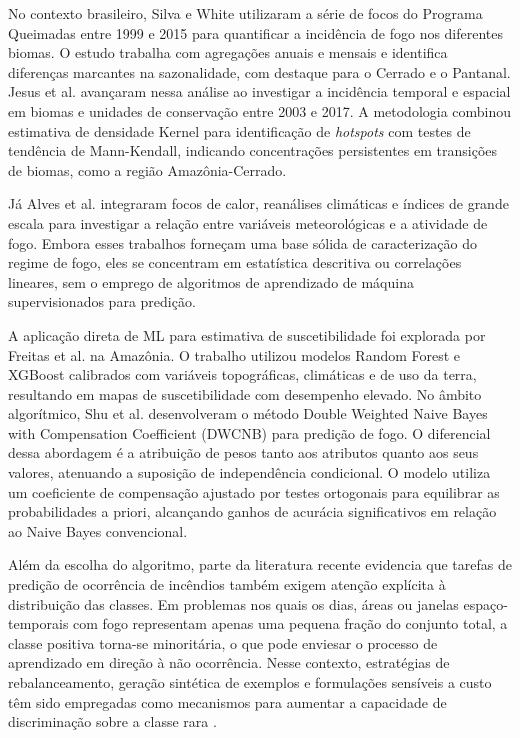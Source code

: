 No contexto brasileiro, Silva e White \cite{silva2016deteccao} utilizaram a série de focos do Programa Queimadas entre 1999 e 2015 para quantificar a incidência de fogo nos diferentes biomas. O estudo trabalha com agregações anuais e mensais e identifica diferenças marcantes na sazonalidade, com destaque para o Cerrado e o Pantanal. Jesus et al. \cite{jesus2020analise} avançaram nessa análise ao investigar a incidência temporal e espacial em biomas e unidades de conservação entre 2003 e 2017. A metodologia combinou estimativa de densidade Kernel para identificação de \textit{hotspots} com testes de tendência de Mann-Kendall, indicando concentrações persistentes em transições de biomas, como a região Amazônia-Cerrado.

Já Alves et al. \cite{alves2021estudo} integraram focos de calor, reanálises climáticas e índices de grande escala para investigar a relação entre variáveis meteorológicas e a atividade de fogo. Embora esses trabalhos forneçam uma base sólida de caracterização do regime de fogo, eles se concentram em estatística descritiva ou correlações lineares, sem o emprego de algoritmos de aprendizado de máquina supervisionados para predição.

A aplicação direta de ML para estimativa de suscetibilidade foi explorada por Freitas et al. \cite{freitas2025xingu} na Amazônia. O trabalho utilizou modelos Random Forest e XGBoost calibrados com variáveis topográficas, climáticas e de uso da terra, resultando em mapas de suscetibilidade com desempenho elevado. No âmbito algorítmico, Shu et al. \cite{shu2021towards} desenvolveram o método Double Weighted Naive Bayes with Compensation Coefficient (DWCNB) para predição de fogo. O diferencial dessa abordagem é a atribuição de pesos tanto aos atributos quanto aos seus valores, atenuando a suposição de independência condicional. O modelo utiliza um coeficiente de compensação ajustado por testes ortogonais para equilibrar as probabilidades a priori, alcançando ganhos de acurácia significativos em relação ao Naive Bayes convencional.

Além da escolha do algoritmo, parte da literatura recente evidencia que tarefas de predição de ocorrência de incêndios também exigem atenção explícita à distribuição das classes. Em problemas nos quais os dias, áreas ou janelas espaço-temporais com fogo representam apenas uma pequena fração do conjunto total, a classe positiva torna-se minoritária, o que pode enviesar o processo de aprendizado em direção à não ocorrência. Nesse contexto, estratégias de rebalanceamento, geração sintética de exemplos e formulações sensíveis a custo têm sido empregadas como mecanismos para aumentar a capacidade de discriminação sobre a classe rara \cite{phelps2021guidelines,perezporras2021wildfires,ling2011costsensitive}.

